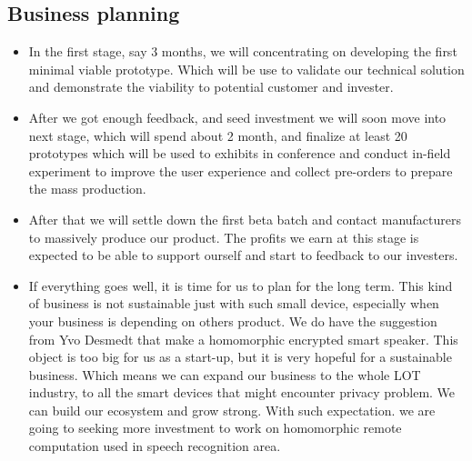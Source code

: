 \documentclass[12pt,twoside]{article}
\begin{document}
\subsection{Business planning}
\begin{itemize}
\item In the first stage, say 3 months, we will concentrating on developing the first minimal viable prototype. Which will be use to validate our technical solution and
demonstrate the viability to potential customer and invester. 
\item After we got enough feedback, and seed investment we will soon move into next stage, which will spend about 2 month, and finalize at least 20 prototypes 
which will be used to exhibits in conference and conduct in-field experiment to improve the user experience and 
collect pre-orders to prepare the mass production. 
\item After that we will settle down the first beta batch and contact manufacturers to massively produce our product.
The profits we earn at this stage is expected to be able to support ourself and start to feedback to our investers.
\item If everything goes well, it is time for us to plan for the long term. This kind of business is not sustainable just with such small device, especially when your 
business is depending on others product. We do have the suggestion from Yvo Desmedt that make a homomorphic encrypted smart speaker. This object is too big for us as 
a start-up, but it is very hopeful for a sustainable business. Which means we can expand our business to the whole LOT industry, to all the smart devices that might encounter
privacy problem. We can build our ecosystem and grow strong. With such expectation. we are going to seeking more investment to work on homomorphic remote computation used 
in speech recognition area.
\end{itemize}
\end{document}
